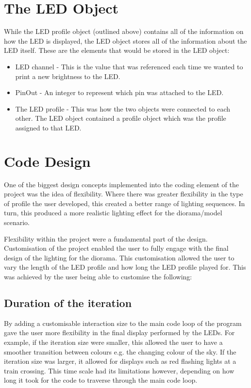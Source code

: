 \section{The LED Object}
While the LED profile object (outlined above) contains all of the information on how the LED is displayed, the LED object stores all of the information about the LED itself. These are the elements that would be stored in the LED object:
\begin{itemize}
\item LED channel - This is the value that was referenced each time we wanted to print a new brightness to the LED.

\item PinOut - An integer to represent which pin was attached to the LED.

\item The LED profile - This was how the two objects were connected to each other. The LED object contained a profile object which was the profile assigned to that LED.
\end{itemize}

\section{Code Design}
One of the biggest design concepts implemented into the coding element of the project was the idea of flexibility. Where there was greater flexibility in the type of profile the user developed, this created a better range of lighting sequences. In turn, this produced a more realistic lighting effect for the diorama/model scenario. 

Flexibility within the project were a fundamental part of the design. Customisation of the project enabled the user to fully engage with the final design of the lighting for the diorama.  This customisation allowed the user to vary the length of the LED profile and how long the LED profile played for. This was achieved by the user being able to customise the following:

\subsection {Duration of the iteration}
By adding a customisable interaction size to the main code loop of the program gave the user more flexibility in the final display performed by the LEDs. For example, if the iteration size were smaller, this allowed the user to have a smoother transition between colours e.g. the changing colour of the sky. If the iteration size was larger, it allowed for displays such as red flashing lights at a train crossing. This time scale had its limitations however, depending on how long it took for the code to traverse through the main code loop. 

